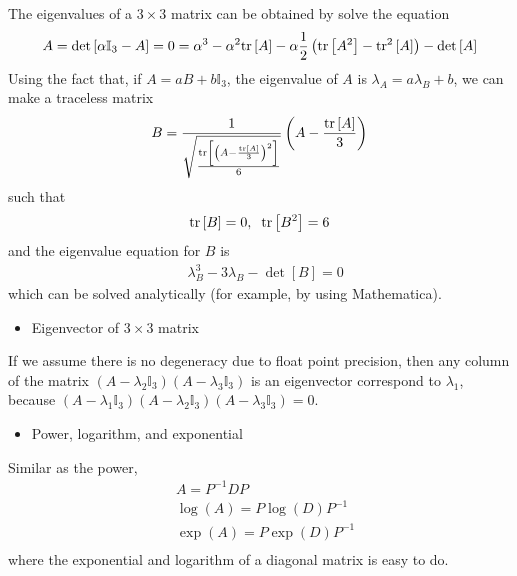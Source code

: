 The eigenvalues of a $3\times 3$ matrix can be obtained by solve the equation
\begin{equation}
\begin{split}
&A=\det \left[\alpha \mathbb{I}_3- A\right]=0=\alpha ^3-\alpha ^2 {\rm tr}\left[A\right]-\alpha \frac{1}{2}\left({\rm tr}\left[A^2\right]-{\rm tr}^2\left[A\right]\right)-\det \left[A\right]\\
\end{split}
\end{equation}
Using the fact that, if $A=a B +b\mathbb{I}_3$, the eigenvalue of $A$ is $\lambda _A = a \lambda _B+b$, we can make a traceless matrix
\begin{equation}
\begin{split}
&B=\frac{1}{\sqrt{\frac{{\rm tr}\left[\left(A-\frac{{\rm tr}\left[A\right]}{3}\right)^2\right]}{6}}}\left(A-\frac{{\rm tr}\left[A\right]}{3}\right)\\
\end{split}
\end{equation}
such that
\begin{equation}
\begin{split}
&{\rm tr}\left[B\right]=0,\;\;{\rm tr}\left[B^2\right]=6\\
\end{split}
\end{equation}
and the eigenvalue equation for $B$ is
\begin{equation}
\begin{split}
&\lambda _B^3-3\lambda _B -\det \left[B\right]=0
\end{split}
\end{equation}
which can be solved analytically (for example, by using Mathematica).


\begin{itemize}
  \item Eigenvector of $3\times 3$ matrix
\end{itemize}

If we assume there is no degeneracy due to float point precision, then any column of the matrix $\left(A-\lambda _2 \mathbb{I}_3\right)\left(A-\lambda _3 \mathbb{I}_3\right)$ is an eigenvector correspond to $\lambda _1$, because $\left(A-\lambda _1 \mathbb{I}_3\right)\left(A-\lambda _2 \mathbb{I}_3\right)\left(A-\lambda _3 \mathbb{I}_3\right)=0$.

\begin{itemize}
  \item Power, logarithm, and exponential
\end{itemize}

Similar as the power,
\begin{equation}
\begin{split}
&A=P^{-1}DP\\
&\log (A)=P\log (D)P^{-1}\\
&\exp (A)=P\exp (D)P^{-1}\\
\end{split}
\end{equation}
where the exponential and logarithm of a diagonal matrix is easy to do.
